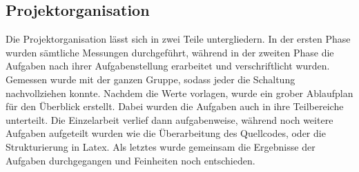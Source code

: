 \subsection {Projektorganisation}
	\par Die Projektorganisation lässt sich in zwei Teile untergliedern. In der ersten Phase wurden sämtliche Messungen durchgeführt, während in der zweiten Phase die Aufgaben nach ihrer Aufgabenstellung erarbeitet und verschriftlicht wurden. Gemessen wurde mit der ganzen Gruppe, sodass jeder die Schaltung nachvollziehen konnte. Nachdem die Werte vorlagen, wurde ein grober Ablaufplan für den Überblick erstellt. Dabei wurden die Aufgaben auch in ihre Teilbereiche unterteilt. Die Einzelarbeit verlief dann aufgabenweise, während noch weitere Aufgaben aufgeteilt wurden wie die Überarbeitung des Quellcodes, oder die Strukturierung in Latex. Als letztes wurde gemeinsam die Ergebnisse der Aufgaben durchgegangen und Feinheiten noch entschieden.
	
